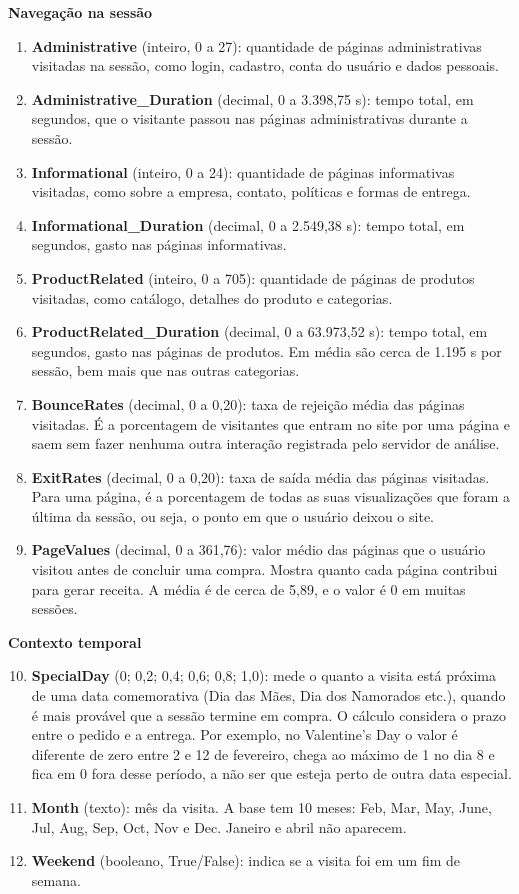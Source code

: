\documentclass[11pt,a4paper]{article}
\begin{document}
\textbf{Navegação na sessão}
\begin{enumerate}
  \item \textbf{Administrative} (inteiro, 0 a 27): quantidade de páginas administrativas visitadas na sessão, como
        login, cadastro, conta do usuário e dados pessoais.
  \item \textbf{Administrative\_Duration} (decimal, 0 a 3.398,75 s): tempo total, em segundos, que o visitante passou
        nas páginas administrativas durante a sessão.
  \item \textbf{Informational} (inteiro, 0 a 24): quantidade de páginas informativas visitadas, como sobre a empresa,
        contato, políticas e formas de entrega.
  \item \textbf{Informational\_Duration} (decimal, 0 a 2.549,38 s): tempo total, em segundos, gasto nas páginas
        informativas.
  \item \textbf{ProductRelated} (inteiro, 0 a 705): quantidade de páginas de produtos visitadas, como catálogo,
        detalhes do produto e categorias.
  \item \textbf{ProductRelated\_Duration} (decimal, 0 a 63.973,52 s): tempo total, em segundos, gasto nas páginas de
        produtos. Em média são cerca de 1.195 s por sessão, bem mais que nas outras categorias.
  \item \textbf{BounceRates} (decimal, 0 a 0,20): taxa de rejeição média das páginas visitadas. É a porcentagem de
        visitantes que entram no site por uma página e saem sem fazer nenhuma outra interação registrada pelo
        servidor de análise.
  \item \textbf{ExitRates} (decimal, 0 a 0,20): taxa de saída média das páginas visitadas. Para uma página, é a
        porcentagem de todas as suas visualizações que foram a última da sessão, ou seja, o ponto em que o usuário
        deixou o site.
  \item \textbf{PageValues} (decimal, 0 a 361,76): valor médio das páginas que o usuário visitou antes de concluir
        uma compra. Mostra quanto cada página contribui para gerar receita. A média é de cerca de 5,89, e o valor é
        0 em muitas sessões.
\end{enumerate}

\textbf{Contexto temporal}
\begin{enumerate}\setcounter{enumi}{9}
  \item \textbf{SpecialDay} (0; 0,2; 0,4; 0,6; 0,8; 1,0): mede o quanto a visita está próxima de uma data
        comemorativa (Dia das Mães, Dia dos Namorados etc.), quando é mais provável que a sessão termine em compra.
        O cálculo considera o prazo entre o pedido e a entrega. Por exemplo, no Valentine's Day o valor é diferente
        de zero entre 2 e 12 de fevereiro, chega ao máximo de 1 no dia 8 e fica em 0 fora desse período, a não ser
        que esteja perto de outra data especial.
  \item \textbf{Month} (texto): mês da visita. A base tem 10 meses: Feb, Mar, May, June, Jul, Aug, Sep, Oct, Nov e
        Dec. Janeiro e abril não aparecem.
  \item \textbf{Weekend} (booleano, True/False): indica se a visita foi em um fim de semana.
\end{enumerate}
\end{document}
